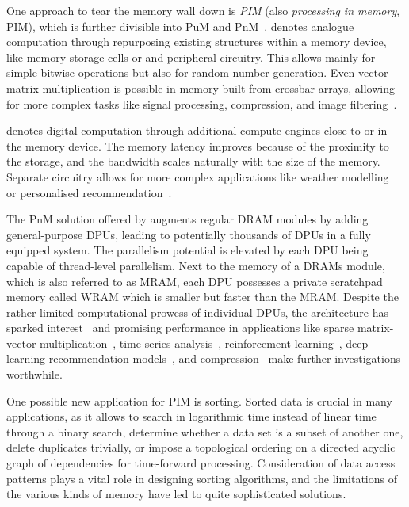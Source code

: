 One approach to tear the memory wall down is \emph{\acl{PIM}} (also \emph{processing in memory}, \acs{PIM}), which is further divisible into \acl*{PuM} and \acl*{PnM}~\cite{mutlu23memorycentric,mutlu2022Benchmarking,peccerillo2022survey}.
 denotes analogue computation through repurposing existing structures within a memory device, like memory storage cells or and peripheral circuitry.
This allows mainly for simple bitwise operations but also for random number generation.
Even vector-matrix multiplication is possible in memory built from crossbar arrays, allowing for more complex tasks like signal processing, compression, and image filtering~\cite{li2017analogue}.

 denotes digital computation through additional compute engines close to or in the memory device.
The memory latency improves because of the proximity to the storage, and the bandwidth scales naturally with the size of the memory.
Separate circuitry allows for more complex applications like weather modelling~\cite{gagandeep2020nero} or personalised recommendation~\cite{liu2020recnmp}.

The \ac{PnM} solution offered by \upmem{} augments regular \ac{DRAM} modules by adding general-purpose \acp*{DPU}, leading to potentially thousands of \acsp*{DPU} in a fully equipped system.
The parallelism potential is elevated by each \acs*{DPU} being capable of thread-level parallelism.
Next to the memory of a \acsp*{DRAM} module, which is also referred to as \acf*{MRAM}, each \acs*{DPU} possesses a private scratchpad memory called \acf*{WRAM} which is smaller but faster than the \acs*{MRAM}.
Despite the rather limited computational prowess of individual \acsp*{DPU}, the architecture has sparked interest~\cite{mutlu23memorycentric,mutlu2022Benchmarking,peccerillo2022survey,hyun2024pathfinding} and promising performance in applications like sparse matrix-vector multiplication~\cite{giannoula2022sparse}, time series analysis~\cite{mutlu2022Benchmarking}, reinforcement learning~\cite{gogineni2024swiftrl}, deep learning recommendation models~\cite{chen2024updlrm}, and compression~\cite{nider2021casestudy} make further investigations worthwhile.

One possible new application for \ac{PIM} is sorting.
Sorted data is crucial in many applications, as it allows to search in logarithmic time instead of linear time through a binary search, determine whether a data set is a subset of another one, delete duplicates trivially, or impose a topological ordering on a directed acyclic graph of dependencies for time-forward processing.
Consideration of data access patterns plays a vital role in designing sorting algorithms, and the limitations of the various kinds of memory have led to quite sophisticated solutions.


